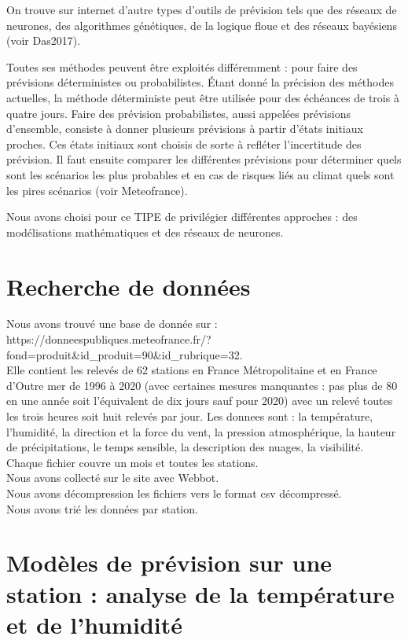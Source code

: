 \documentclass[11pt,a4paper]{article}
\begin{document}
On trouve sur internet d'autre types d'outils de prévision tels que des réseaux de neurones, des algorithmes génétiques, de la logique floue et des réseaux bayésiens %
 (voir Das2017).

Toutes ses méthodes peuvent être exploités différemment : pour faire des prévisions déterministes ou probabilistes. Étant donné la précision des méthodes actuelles, la méthode déterministe peut être utilisée pour des échéances de trois à quatre jours. Faire des prévision probabilistes, aussi appelées prévisions d'ensemble, consiste à donner plusieurs prévisions à partir d'états initiaux proches. Ces états initiaux sont choisis de sorte à refléter l'incertitude des prévision. Il faut ensuite comparer les différentes prévisions pour déterminer quels sont les scénarios les plus probables et en cas de risques liés au climat quels sont les pires scénarios (voir Meteofrance).

\vspace{0.6cm}
Nous avons choisi pour ce TIPE de privilégier différentes approches : des modélisations mathématiques et des réseaux de neurones.

\section{Recherche de données}

Nous avons trouvé une base de donnée sur  : \\
https://donneespubliques.meteofrance.fr/?fond=produit\&id\_produit=90\&id\_rubrique=32. \\
Elle contient les relevés de 62 stations en France Métropolitaine et en France d’Outre mer
de 1996 à 2020  (avec certaines mesures manquantes : pas plus de 80 en une année soit l'équivalent de dix jours sauf pour 2020)
avec un relevé toutes les trois heures soit huit relevés par jour.
Les donnees sont : la température, l'humidité, la direction et la force du vent, la pression atmosphérique, la hauteur de précipitations, le temps sensible, la description des nuages, la visibilité.
Chaque fichier couvre un mois et toutes les stations. \\
Nous avons collecté sur le site avec Webbot. \\
Nous avons décompression les fichiers vers le format csv décompressé. \\
Nous avons trié les données par station. \\

\section{Modèles de prévision sur une station : analyse de la température et de l'humidité}
\end{document}
